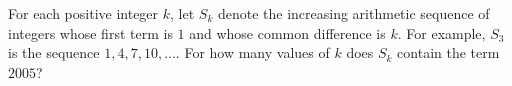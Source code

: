 For each positive integer $k$, let $S_k$ denote the increasing arithmetic sequence of integers whose first term is $1$ and whose common difference is $k$. For example, $S_3$ is the sequence $1,4,7,10,...$. For how many values of $k$ does $S_k$ contain the term $2005$?